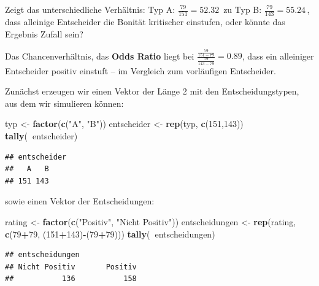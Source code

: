\documentclass[12pt,ngerman,paper=a4,pagesize,DIV=13]{scrreprt}
\newenvironment{Shaded}{\begin{snugshade}}{\end{snugshade}}
\newcommand{\DecValTok}[1]{\textcolor[rgb]{0.00,0.00,0.81}{#1}}
\newcommand{\KeywordTok}[1]{\textcolor[rgb]{0.13,0.29,0.53}{\textbf{#1}}}
\newcommand{\NormalTok}[1]{#1}
\newcommand{\OperatorTok}[1]{\textcolor[rgb]{0.81,0.36,0.00}{\textbf{#1}}}
\newcommand{\StringTok}[1]{\textcolor[rgb]{0.31,0.60,0.02}{#1}}
\begin{document}
Zeigt das unterschiedliche Verhältnis: Typ A:
\(\frac{79}{151}=52.32\)\(\,\) zu Typ B: \(\frac{79}{143}=55.24\)\(\,\),
dass alleinige Entscheider die Bonität kritischer einstufen, oder könnte
das Ergebnis Zufall sein?

Das Chancenverhältnis, das \textbf{Odds Ratio} liegt bei
\(\frac{\frac{79}{151-79}}{\frac{79}{143-79}}=0.89\), dass ein
alleiniger Entscheider positiv einstuft -- im Vergleich zum vorläufigen
Entscheider.

Zunächst erzeugen wir einen Vektor der Länge 2 mit den
Entscheidungstypen, aus dem wir simulieren können:

\begin{Shaded}
\begin{Highlighting}[]
\NormalTok{typ <-}\StringTok{ }\KeywordTok{factor}\NormalTok{(}\KeywordTok{c}\NormalTok{(}\StringTok{"A"}\NormalTok{, }\StringTok{"B"}\NormalTok{))}
\NormalTok{entscheider <-}\StringTok{ }\KeywordTok{rep}\NormalTok{(typ, }\KeywordTok{c}\NormalTok{(}\DecValTok{151}\NormalTok{,}\DecValTok{143}\NormalTok{))}
\KeywordTok{tally}\NormalTok{(}\OperatorTok{~}\NormalTok{entscheider)}
\end{Highlighting}
\end{Shaded}

\begin{verbatim}
## entscheider
##   A   B 
## 151 143
\end{verbatim}

sowie einen Vektor der Entscheidungen:

\begin{Shaded}
\begin{Highlighting}[]
\NormalTok{rating <-}\StringTok{ }\KeywordTok{factor}\NormalTok{(}\KeywordTok{c}\NormalTok{(}\StringTok{"Positiv"}\NormalTok{, }\StringTok{"Nicht Positiv"}\NormalTok{))}
\NormalTok{entscheidungen <-}\StringTok{ }\KeywordTok{rep}\NormalTok{(rating, }\KeywordTok{c}\NormalTok{(}\DecValTok{79}\OperatorTok{+}\DecValTok{79}\NormalTok{, (}\DecValTok{151}\OperatorTok{+}\DecValTok{143}\NormalTok{)}\OperatorTok{-}\NormalTok{(}\DecValTok{79}\OperatorTok{+}\DecValTok{79}\NormalTok{)))}
\KeywordTok{tally}\NormalTok{(}\OperatorTok{~}\NormalTok{entscheidungen)}
\end{Highlighting}
\end{Shaded}

\begin{verbatim}
## entscheidungen
## Nicht Positiv       Positiv 
##           136           158
\end{verbatim}
\end{document}
